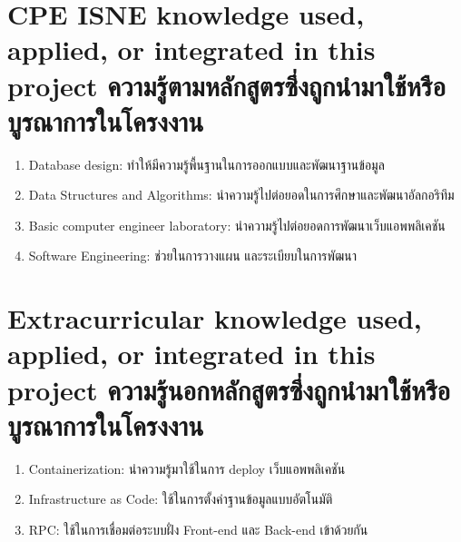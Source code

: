 \section{\ifenglish%
        \ifcpe CPE \else ISNE \fi knowledge used, applied, or integrated in this project
  \else%
        ความรู้ตามหลักสูตรซึ่งถูกนำมาใช้หรือบูรณาการในโครงงาน
  \fi
 }
\begin{enumerate}
      \item Database design: ทำให้มีความรู้พื้นฐานในการออกแบบและพัฒนาฐานข้อมูล
      \item Data Structures and Algorithms: นำความรู้ไปต่อยอดในการศึกษาและพัฒนาอัลกอริทึม
      \item Basic computer engineer laboratory: นำความรู้ไปต่อยอดการพัฒนาเว็บแอพพลิเคชัน
      \item Software Engineering: ช่วยในการวางแผน และระเบียบในการพัฒนา
\end{enumerate}


\section{\ifenglish%
        Extracurricular knowledge used, applied, or integrated in this project
  \else%
        ความรู้นอกหลักสูตรซึ่งถูกนำมาใช้หรือบูรณาการในโครงงาน
  \fi
 }
\begin{enumerate}
      \item Containerization: นำความรู้มาใช้ในการ deploy เว็บแอพพลิเคชัน
      \item Infrastructure as Code: ใช้ในการตั้งค่าฐานข้อมูลแบบอัตโนมัติ
      \item RPC: ใช้ในการเชื่อมต่อระบบฝั่ง Front-end และ Back-end เข้าด้วยกัน
\end{enumerate}
